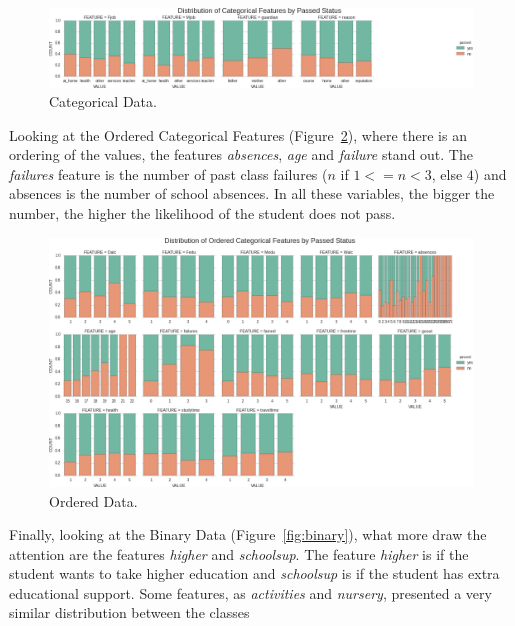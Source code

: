 \documentclass[a4paper]{article}
\begin{document}
\begin{figure}[ht]
\centering
\includegraphics[width=1\textwidth]{figures/categorical/categorical.png}
\caption{\label{fig:categorical}Categorical Data.}
\end{figure}

Looking at the Ordered Categorical Features (Figure~\ref{fig:ordCategorical}), where there is an ordering of the values, the features \textit{absences}, \textit{age} and \textit{failure} stand out. The \textit{failures} feature is the number of past class failures ($n$ if $1<=n<3$, else $4$) and absences is the number of school absences. In all these variables, the bigger the number, the higher the likelihood of the student does not pass.

\begin{figure}[ht]
\centering
\includegraphics[width=1\textwidth]{figures/ordCategorical/ordCategorical.png}
\caption{\label{fig:ordCategorical}Ordered Data.}
\end{figure}


Finally, looking at the Binary Data (Figure~\ref{fig:binary}), what more draw the attention are the features \textit{higher} and \textit{schoolsup}. The feature \textit{higher} is if the student wants to take higher education and \textit{schoolsup} is if the student has extra educational support. Some features, as \textit{activities} and \textit{nursery}, presented a very similar distribution between the classes
\end{document}

